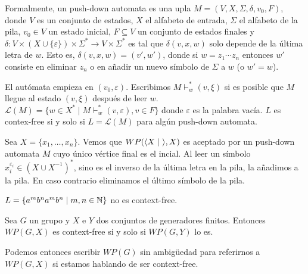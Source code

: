 \documentclass[twoside, 11pt]{article}
\begin{document}
Formalmente, un push-down automata es una upla $M=(V,X,\Sigma, \delta, v_0, F)$, donde $V$ es un conjunto de estados, $X$ el alfabeto de entrada, $\Sigma$ el alfabeto de la pila, $v_0\in V$ un estado inicial, $F\subseteq V$ un conjunto de estados finales y $\delta:V\times (X\cup\{\varepsilon\})\times\Sigma^*\to V\times\Sigma^*$ es tal que $\delta(v,x,w)$ solo depende de la última letra de $w$. Esto es, $\delta(v,x,w)=(v',w')$, donde si $w=z_1\cdots z_n$ entonces $w'$ consiste en eliminar $z_n$ o en añadir un nuevo símbolo de $\Sigma$ a $w$ (o $w'=w$). 

El autómata empieza en $(v_0,\varepsilon)$. Escribimos $M\vdash_w^* (v,\xi)$ si es posible que $M$ llegue al estado $(v,\xi)$ después de leer $w$. $\mathcal{L}(M)=\{w\in X^*\mid M\vdash_w^* (v,\varepsilon), v\in F\}$ donde $\varepsilon$ es la palabra vacía. $L$ es contex-free si y solo si $L=\mathcal{L}(M)$ para algún push-down automata. 

\begin{ej}
Sea $X=\{x_1,\dots, x_n\}$. Vemos que $WP(\langle{X\mid\ }\rangle, X)$ es aceptado por un push-down automata $M$ cuyo único vértice final es el incial. Al leer un símbolo $x_i^{\varepsilon_i}\in (X\cup X^{-1})^*$, sino es el inverso de la última letra en la pila, la añadimos a la pila. En caso contrario eliminamos el último símbolo de la pila. 
\end{ej}

\begin{ej}
$L=\{a^mb^na^mb^n\mid m,n\in\mathbb{N}\}$ no es context-free. 
\end{ej}

\begin{lemma}
Sea $G$ un grupo y $X$ e $Y$ dos conjuntos de generadores finitos. Entonces $WP(G,X)$ es context-free si y solo si $WP(G,Y)$ lo es. 
\end{lemma}

Podemos entonces escribir $WP(G)$ sin ambigüedad para referirnos a $WP(G,X)$ si estamos hablando de ser context-free. 
\end{document}
